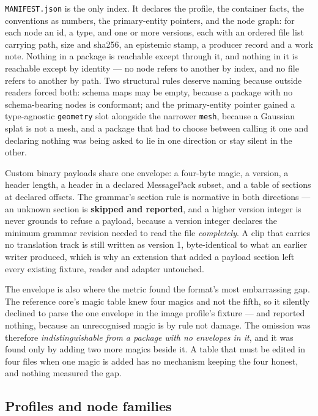 \documentclass[10pt,twocolumn,letterpaper]{article}
\newcommand{\code}[1]{\texttt{\small #1}}
\begin{document}
\code{MANIFEST.json} is the only index. It declares the profile, the container facts, the conventions as numbers, the primary-entity pointers, and the node graph: for each node an id, a type, and one or more versions, each with an ordered file list carrying path, size and sha256, an epistemic stamp, a producer record and a work note. Nothing in a package is reachable except through it, and nothing in it is reachable except by identity --- no node refers to another by index, and no file refers to another by path. Two structural rules deserve naming because outside readers forced both: schema maps may be empty, because a package with no schema-bearing nodes is conformant; and the primary-entity pointer gained a type-agnostic \code{geometry} slot alongside the narrower \code{mesh}, because a Gaussian splat is not a mesh, and a package that had to choose between calling it one and declaring nothing was being asked to lie in one direction or stay silent in the other.

Custom binary payloads share one envelope: a four-byte magic, a version, a header length, a header in a declared MessagePack subset, and a table of sections at declared offsets. The grammar's section rule is normative in both directions --- an unknown section is \textbf{skipped and reported}, and a higher version integer is never grounds to refuse a payload, because a version integer declares the minimum grammar revision needed to read the file \emph{completely}. A clip that carries no translation track is still written as version 1, byte-identical to what an earlier writer produced, which is why an extension that added a payload section left every existing fixture, reader and adapter untouched.

The envelope is also where the metric found the format's most embarrassing gap. The reference core's magic table knew four magics and not the fifth, so it silently declined to parse the one envelope in the image profile's fixture --- and reported nothing, because an unrecognised magic is by rule not damage. The omission was therefore \emph{indistinguishable from a package with no envelopes in it}, and it was found only by adding two more magics beside it. A table that must be edited in four files when one magic is added has no mechanism keeping the four honest, and nothing measured the gap.

\subsection{Profiles and node families}
\end{document}
